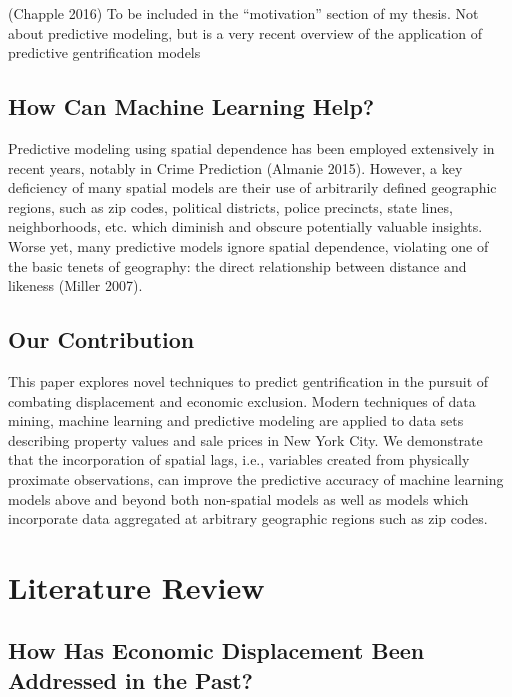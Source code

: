 \documentclass[]{article}
\begin{document}
(Chapple 2016) To be included in the ``motivation'' section of my
thesis. Not about predictive modeling, but is a very recent overview of
the application of predictive gentrification models

\subsection{How Can Machine Learning
Help?}\label{how-can-machine-learning-help}

Predictive modeling using spatial dependence has been employed
extensively in recent years, notably in Crime Prediction (Almanie 2015).
However, a key deficiency of many spatial models are their use of
arbitrarily defined geographic regions, such as zip codes, political
districts, police precincts, state lines, neighborhoods, etc. which
diminish and obscure potentially valuable insights. Worse yet, many
predictive models ignore spatial dependence, violating one of the basic
tenets of geography: the direct relationship between distance and
likeness (Miller 2007).

\subsection{Our Contribution}\label{our-contribution}

This paper explores novel techniques to predict gentrification in the
pursuit of combating displacement and economic exclusion. Modern
techniques of data mining, machine learning and predictive modeling are
applied to data sets describing property values and sale prices in New
York City. We demonstrate that the incorporation of spatial lags, i.e.,
variables created from physically proximate observations, can improve
the predictive accuracy of machine learning models above and beyond both
non-spatial models as well as models which incorporate data aggregated
at arbitrary geographic regions such as zip codes.

\section{Literature Review}\label{literature-review}

\subsection{How Has Economic Displacement Been Addressed in the
Past?}\label{how-has-economic-displacement-been-addressed-in-the-past}
\end{document}
